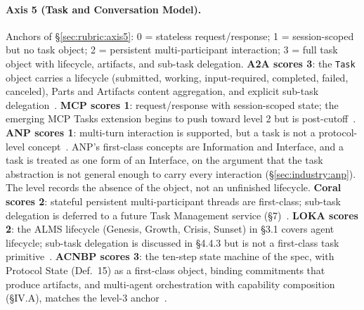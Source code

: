 \paragraph{Axis 5 (Task and Conversation Model).}
Anchors of \S\ref{sec:rubric:axis5}: 0 = stateless
request/response; 1 = session-scoped but no task object;
2 = persistent multi-participant interaction; 3 = full
task object with lifecycle, artifacts, and sub-task
delegation. \textbf{A2A scores 3}: the \texttt{Task}
object carries a lifecycle (submitted, working,
input-required, completed, failed, canceled), Parts and
Artifacts content aggregation, and explicit sub-task
delegation~\cite{spec_a2a}. \textbf{MCP scores 1}:
request/response with session-scoped state; the emerging
MCP Tasks extension begins to push toward level 2 but
is post-cutoff~\cite{spec_mcp}. \textbf{ANP scores 1}:
multi-turn interaction is supported, but a task is not a
protocol-level concept~\cite{spec_anp}. ANP's first-class
concepts are Information and Interface, and a task is
treated as one form of an Interface, on the argument that
the task abstraction is not general enough to carry every
interaction (\S\ref{sec:industry:anp}). The level records
the absence of the object, not an unfinished lifecycle. \textbf{Coral
scores 2}: stateful persistent multi-participant threads
are first-class; sub-task delegation is deferred to a
future Task Management service (\S7)~\cite{spec_coral}.
\textbf{LOKA scores 2}: the ALMS lifecycle (Genesis,
Growth, Crisis, Sunset) in \S3.1 covers agent lifecycle;
sub-task delegation is discussed in \S4.4.3 but is not a
first-class task primitive~\cite{spec_loka}.
\textbf{ACNBP scores 3}: the ten-step state machine of
the spec, with Protocol State (Def.~15) as a first-class
object, binding commitments that produce artifacts, and
multi-agent orchestration with capability composition
(\S IV.A), matches the level-3 anchor~\cite{spec_acnbp}.

